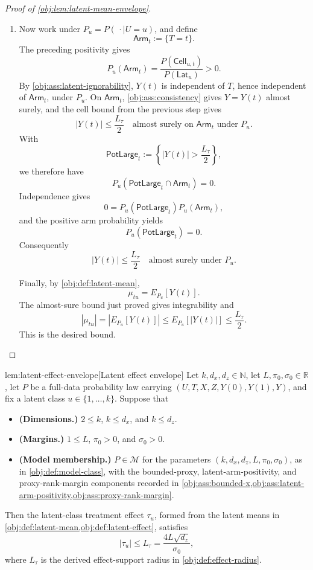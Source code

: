 \documentclass[11pt]{article}
\begin{document}
\begin{proof}[Proof of \cref{obj:lem:latent-mean-envelope}]
\begin{enumerate}
\item Now work under \(P_u=P(\,\cdot\mid U=u)\), and define
\[
\mathsf{Arm}_t:=\{T=t\}.
\]
The preceding positivity gives
\[
P_u(\mathsf{Arm}_t)
=
\frac{P(\mathsf{Cell}_{u,t})}{P(\mathsf{Lat}_u)}
>0.
\]
By \cref{obj:ass:latent-ignorability}, \(Y(t)\) is independent of \(T\), hence independent of \(\mathsf{Arm}_t\), under \(P_u\). On \(\mathsf{Arm}_t\), \cref{obj:ass:consistency} gives \(Y=Y(t)\) almost surely, and the cell bound from the previous step gives
\[
|Y(t)|\le \frac{L_\tau}{2}
\quad\text{almost surely on }\mathsf{Arm}_t\text{ under }P_u.
\]
With
\[
\mathsf{PotLarge}_t:=\left\{|Y(t)|>\frac{L_\tau}{2}\right\},
\]
we therefore have
\[
P_u(\mathsf{PotLarge}_t\cap\mathsf{Arm}_t)=0.
\]
Independence gives
\[
0
=
P_u(\mathsf{PotLarge}_t)P_u(\mathsf{Arm}_t),
\]
and the positive arm probability yields
\[
P_u(\mathsf{PotLarge}_t)=0.
\]
Consequently
\[
|Y(t)|\le \frac{L_\tau}{2}
\quad\text{almost surely under }P_u. %
\]

Finally, by \cref{obj:def:latent-mean},
\[
\mu_{tu}=E_{P_u}[Y(t)].
\]
The almost-sure bound just proved gives integrability and
\[
|\mu_{tu}|
=
\left|E_{P_u}[Y(t)]\right|
\le
E_{P_u}[|Y(t)|]
\le
\frac{L_\tau}{2}.
\]
This is the desired bound. %
\end{enumerate}
\end{proof}

\begin{lemmav}{lem:latent-effect-envelope}[Latent effect envelope]
Let \(k,d_x,d_z\in\mathbb N\), let \(L,\pi_0,\sigma_0\in\mathbb R\), let \(P\) be a full-data probability law carrying \((U,T,X,Z,Y(0),Y(1),Y)\), and fix a latent class \(u\in\{1,\ldots,k\}\). Suppose that
\begin{itemize}
\item \textbf{(Dimensions.)} \(2\le k\), \(k\le d_x\), and \(k\le d_z\).
\item \textbf{(Margins.)} \(1\le L\), \(\pi_0>0\), and \(\sigma_0>0\).
\item \textbf{(Model membership.)} \(P\in\mathcal M\) for the parameters \((k,d_x,d_z,L,\pi_0,\sigma_0)\), as in \cref{obj:def:model-class}, with the bounded-proxy, latent-arm-positivity, and proxy-rank-margin components recorded in \cref{obj:ass:bounded-x,obj:ass:latent-arm-positivity,obj:ass:proxy-rank-margin}.
\end{itemize}
Then the latent-class treatment effect \(\tau_u\), formed from the latent means in \cref{obj:def:latent-mean,obj:def:latent-effect}, satisfies
\[
|\tau_u|\le L_\tau=\frac{4L\sqrt{d_z}}{\sigma_0},
\]
where \(L_\tau\) is the derived effect-support radius in \cref{obj:def:effect-radius}.
\end{lemmav}
\end{document}
